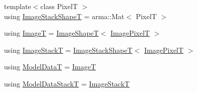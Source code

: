 \begin{DoxyCompactItemize}
\item 
{\footnotesize template$<$class PixelT $>$ }\\using \hyperlink{classmappel_1_1ImageFormat1DBase_ad9d4f0c3d04f3cecf3bf6b4709dcb4a8}{Image\+Stack\+ShapeT} = arma\+::\+Mat$<$ PixelT $>$
\item 
using \hyperlink{classmappel_1_1ImageFormat1DBase_a521a1ff391a52a636fac4aac7c7ba02c}{ImageT} = \hyperlink{classmappel_1_1ImageFormat1DBase_a20d315459b83c348b1465614699783b3}{Image\+ShapeT}$<$ \hyperlink{classmappel_1_1ImageFormat1DBase_a156fe500fd249cb4b77bdb0abc0dd0ea}{Image\+PixelT} $>$
\item 
using \hyperlink{classmappel_1_1ImageFormat1DBase_a81e3246d1c5c37ebf9077b7b5bd25a76}{Image\+StackT} = \hyperlink{classmappel_1_1ImageFormat1DBase_ad9d4f0c3d04f3cecf3bf6b4709dcb4a8}{Image\+Stack\+ShapeT}$<$ \hyperlink{classmappel_1_1ImageFormat1DBase_a156fe500fd249cb4b77bdb0abc0dd0ea}{Image\+PixelT} $>$
\item 
using \hyperlink{classmappel_1_1PoissonNoise1DObjective_a0f72eebcb9fb785a5489fc5489bff9b0}{Model\+DataT} = \hyperlink{classmappel_1_1ImageFormat1DBase_a521a1ff391a52a636fac4aac7c7ba02c}{ImageT}
\item 
using \hyperlink{classmappel_1_1PoissonNoise1DObjective_a62f5cb009e4c0e53fdfbf90b3153b94f}{Model\+Data\+StackT} = \hyperlink{classmappel_1_1ImageFormat1DBase_a81e3246d1c5c37ebf9077b7b5bd25a76}{Image\+StackT}
\end{DoxyCompactItemize}
